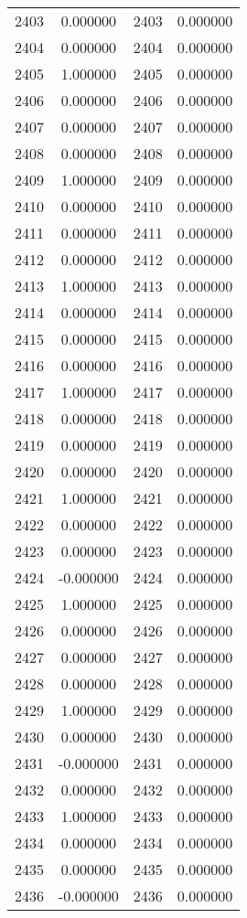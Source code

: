 \documentclass[12pt]{article}
\begin{document}
\begin{longtable}{@{}cccc@{}}
2403 & 0.000000 & 2403 & 0.000000 \\
2404 & 0.000000 & 2404 & 0.000000 \\
2405 & 1.000000 & 2405 & 0.000000 \\
2406 & 0.000000 & 2406 & 0.000000 \\
2407 & 0.000000 & 2407 & 0.000000 \\
2408 & 0.000000 & 2408 & 0.000000 \\
2409 & 1.000000 & 2409 & 0.000000 \\
2410 & 0.000000 & 2410 & 0.000000 \\
2411 & 0.000000 & 2411 & 0.000000 \\
2412 & 0.000000 & 2412 & 0.000000 \\
2413 & 1.000000 & 2413 & 0.000000 \\
2414 & 0.000000 & 2414 & 0.000000 \\
2415 & 0.000000 & 2415 & 0.000000 \\
2416 & 0.000000 & 2416 & 0.000000 \\
2417 & 1.000000 & 2417 & 0.000000 \\
2418 & 0.000000 & 2418 & 0.000000 \\
2419 & 0.000000 & 2419 & 0.000000 \\
2420 & 0.000000 & 2420 & 0.000000 \\
2421 & 1.000000 & 2421 & 0.000000 \\
2422 & 0.000000 & 2422 & 0.000000 \\
2423 & 0.000000 & 2423 & 0.000000 \\
2424 & -0.000000 & 2424 & 0.000000 \\
2425 & 1.000000 & 2425 & 0.000000 \\
2426 & 0.000000 & 2426 & 0.000000 \\
2427 & 0.000000 & 2427 & 0.000000 \\
2428 & 0.000000 & 2428 & 0.000000 \\
2429 & 1.000000 & 2429 & 0.000000 \\
2430 & 0.000000 & 2430 & 0.000000 \\
2431 & -0.000000 & 2431 & 0.000000 \\
2432 & 0.000000 & 2432 & 0.000000 \\
2433 & 1.000000 & 2433 & 0.000000 \\
2434 & 0.000000 & 2434 & 0.000000 \\
2435 & 0.000000 & 2435 & 0.000000 \\
2436 & -0.000000 & 2436 & 0.000000 \\

\end{longtable}
\end{document}
